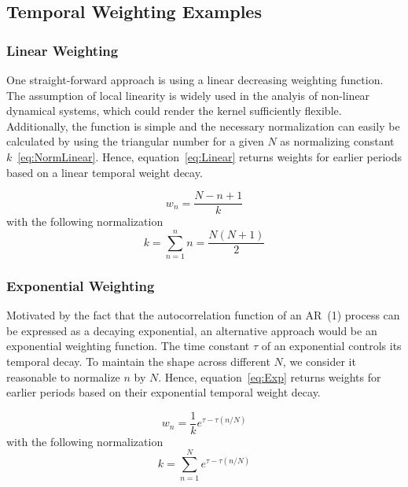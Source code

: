 \documentclass[a4paper]{article}
\begin{document}
\subsection{Temporal Weighting Examples}

\subsubsection{Linear Weighting}

One straight-forward approach is using a linear decreasing weighting function. The assumption of local linearity is widely used in the analyis of non-linear dynamical systems, which could render the kernel sufficiently flexible.
Additionally, the function is simple and the necessary normalization can easily be calculated by using the triangular number for a given $N$ as normalizing constant $k$~\eqref{eq:NormLinear}.
Hence, equation~\eqref{eq:Linear} returns weights for earlier periods based on a linear temporal weight decay.

\begin{equation}
    w_n = \frac{N-n+1}{k}\label{eq:Linear}
\end{equation}
with the following normalization
\begin{equation}
    k  = \sum_{n=1}^{n} n = \frac{N(N+1)}{2}\label{eq:NormLinear}
\end{equation}

\subsubsection{Exponential Weighting}

Motivated by the fact that the autocorrelation function of an AR~(1) process can be expressed as a decaying exponential, an alternative approach would be an exponential weighting function.
The time constant $\tau$ of an exponential controls its temporal decay. To maintain the shape across different $N$, we consider it reasonable to normalize $n$ by $N$. Hence, equation~\eqref{eq:Exp} returns weights for earlier periods based on their exponential temporal weight decay.

\begin{equation}
    w_n = \frac{1}{k} e^{\tau-\tau{(n/N)}}\label{eq:Exp}
\end{equation}
with the following normalization
\begin{equation}
    k  = \sum_{n=1}^{N} e^{\tau-\tau{(n/N)}}\label{eq:NormExp}
\end{equation}
\end{document}
